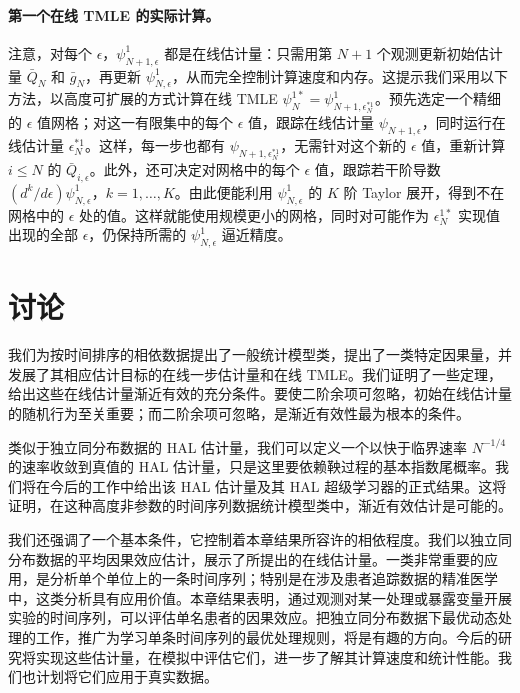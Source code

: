 \paragraph{第一个在线 TMLE 的实际计算。}
注意，对每个 $\epsilon$，$\psi_{N+1,\epsilon}^1$ 都是在线估计量：只需用第 $N+1$ 个观测更新初始估计量 $\bar Q_N$ 和 $\bar g_N$，再更新 $\psi_{N,\epsilon}^1$，从而完全控制计算速度和内存。这提示我们采用以下方法，以高度可扩展的方式计算在线 TMLE $\psi_N^{1*}=\psi_{N+1,\epsilon_N^{*1}}^1$。预先选定一个精细的 $\epsilon$ 值网格；对这一有限集中的每个 $\epsilon$ 值，跟踪在线估计量 $\psi_{N+1,\epsilon}$，同时运行在线估计量 $\epsilon_N^{*1}$。这样，每一步也都有 $\psi_{N+1,\epsilon_N^{*1}}$，无需针对这个新的 $\epsilon$ 值，重新计算 $i\leq N$ 的 $\bar Q_{i,\epsilon}$。此外，还可决定对网格中的每个 $\epsilon$ 值，跟踪若干阶导数 $({d^k}/{d\epsilon})\psi_{N,\epsilon}^1$，$k=1,\ldots,K$。由此便能利用 $\psi_{N,\epsilon}^1$ 的 $K$ 阶 Taylor 展开，得到不在网格中的 $\epsilon$ 处的值。这样就能使用规模更小的网格，同时对可能作为 $\epsilon_N^{1*}$ 实现值出现的全部 $\epsilon$，仍保持所需的 $\psi_{N,\epsilon}^1$ 逼近精度。

\section{讨论}

我们为按时间排序的相依数据提出了一般统计模型类，提出了一类特定因果量，并发展了其相应估计目标的在线一步估计量和在线 TMLE。我们证明了一些定理，给出这些在线估计量渐近有效的充分条件。要使二阶余项可忽略，初始在线估计量的随机行为至关重要；而二阶余项可忽略，是渐近有效性最为根本的条件。

类似于独立同分布数据的 HAL 估计量，我们可以定义一个以快于临界速率 $N^{-1/4}$ 的速率收敛到真值的 HAL 估计量，只是这里要依赖鞅过程的基本指数尾概率。我们将在今后的工作中给出该 HAL 估计量及其 HAL 超级学习器的正式结果。这将证明，在这种高度非参数的时间序列数据统计模型类中，渐近有效估计是可能的。

我们还强调了一个基本条件，它控制着本章结果所容许的相依程度。我们以独立同分布数据的平均因果效应估计，展示了所提出的在线估计量。一类非常重要的应用，是分析单个单位上的一条时间序列；特别是在涉及患者追踪数据的精准医学中，这类分析具有应用价值。本章结果表明，通过观测对某一处理或暴露变量开展实验的时间序列，可以评估单名患者的因果效应。把独立同分布数据下最优动态处理的工作，推广为学习单条时间序列的最优处理规则，将是有趣的方向。今后的研究将实现这些估计量，在模拟中评估它们，进一步了解其计算速度和统计性能。我们也计划将它们应用于真实数据。

